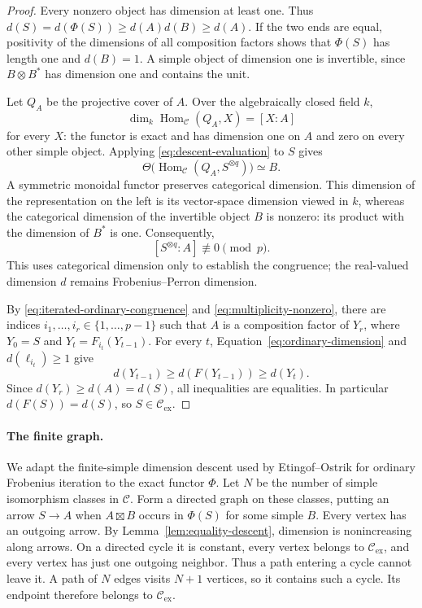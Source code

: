 \begin{proof}
Every nonzero object has dimension at least one.  Thus
\(d(S)=d(\Phi(S))\geq d(A)d(B)\geq d(A)\).
If the two ends are equal, positivity of the dimensions of all
composition factors shows that \(\Phi(S)\) has length one and
\(d(B)=1\).  A simple object of dimension one is invertible, since
\(B\otimes B^*\) has dimension one and contains the unit.

Let \(Q_A\) be the projective cover of \(A\).  Over the algebraically
closed field \(k\),
\[
 \dim_k\operatorname{Hom}_{\mathcal C}(Q_A,X)=[X:A]
\]
for every \(X\): the functor is exact and has dimension one on \(A\)
and zero on every other simple object.  Applying
\eqref{eq:descent-evaluation} to \(S\) gives
\[
 \Theta\bigl(\operatorname{Hom}_{\mathcal C}(Q_A,S^{\otimes q})\bigr)
 \simeq B.
\]
A symmetric monoidal functor preserves categorical dimension.  This
dimension of the representation on the left is its vector-space dimension
viewed in \(k\), whereas the categorical dimension of the invertible
object \(B\) is nonzero: its product with the dimension of \(B^*\) is one.  Consequently,
\begin{equation}\label{eq:multiplicity-nonzero}
 [S^{\otimes q}:A]\not\equiv0\pmod p.
\end{equation}
This uses categorical dimension only to establish the congruence;
the real-valued dimension \(d\) remains Frobenius--Perron dimension.

By \eqref{eq:iterated-ordinary-congruence} and
\eqref{eq:multiplicity-nonzero}, there are indices
\(i_1,\ldots,i_r\in\{1,\ldots,p-1\}\) such that \(A\) is a composition
factor of \(Y_r\), where \(Y_0=S\) and \(Y_t=F_{i_t}(Y_{t-1})\).
For every \(t\), Equation~\eqref{eq:ordinary-dimension} and
\(d(\ell_{i_t})\geq1\) give
\[
 d(Y_{t-1})\geq d(F(Y_{t-1}))\geq d(Y_t).
\]
Since \(d(Y_r)\geq d(A)=d(S)\), all inequalities are equalities.
In particular \(d(F(S))=d(S)\), so
\(S\in\mathcal C_{\mathrm{ex}}\).
\end{proof}

\paragraph{The finite graph.}

We adapt the finite-simple dimension descent used by Etingof--Ostrik
for ordinary Frobenius iteration
\cite[Proposition~10.1]{EtingofOstrikFrobenius} to the exact functor
\(\Phi\).
Let \(N\) be the number of simple isomorphism classes in \(\mathcal C\).
Form a directed graph on these classes, putting an arrow \(S\to A\)
when \(A\boxtimes B\) occurs in \(\Phi(S)\) for some simple \(B\).
Every vertex has an outgoing arrow.  By Lemma~\ref{lem:equality-descent},
dimension is nonincreasing along arrows.  On a directed cycle it is
constant, every vertex belongs to \(\mathcal C_{\mathrm{ex}}\), and every
vertex has just one outgoing neighbor.  Thus a path entering a cycle
cannot leave it.  A path of \(N\) edges visits \(N+1\) vertices, so it
contains such a cycle.  Its endpoint therefore belongs to
\(\mathcal C_{\mathrm{ex}}\).


